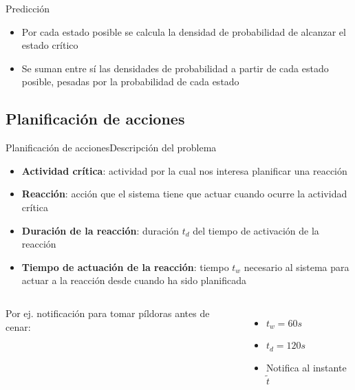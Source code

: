 \documentclass[9pt, handout]{beamer}
\begin{document}
      \begin{frame}{Predicción}
      	
      	\begin{itemize}
        	\item Por cada estado posible se calcula la densidad de probabilidad de alcanzar el estado crítico
        	\item Se suman entre sí las densidades de probabilidad a partir de cada estado posible, pesadas por la probabilidad de cada estado
      	\end{itemize}
      	\vspace{-1em}
      	
      \end{frame}
      
    \subsection{Planificación de acciones}
      \begin{frame}{Planificación de acciones}{Descripción del problema}
        \begin{itemize}
          \item \textbf{Actividad crítica}: actividad por la cual nos interesa planificar una reacción
          \item \textbf{Reacción}: acción que el sistema tiene que actuar cuando ocurre la actividad crítica
          \item \textbf{Duración de la reacción}: duración $t_d$ del tiempo de activación de la reacción
          \item \textbf{Tiempo de actuación de la reacción}: tiempo $t_w$ necesario al sistema para actuar a la reacción desde cuando ha sido planificada
        \end{itemize}
        
      	\begin{columns}
      		\centering
      		
      		Por ej. notificación para tomar píldoras antes de cenar:
      		\begin{itemize}
      			\item $t_w = 60s$
      			\item $t_d = 120s$
      			\item Notifica al instante $\tilde t$
      		\end{itemize}
      	\end{columns}
      \end{frame}
      
\end{document}
